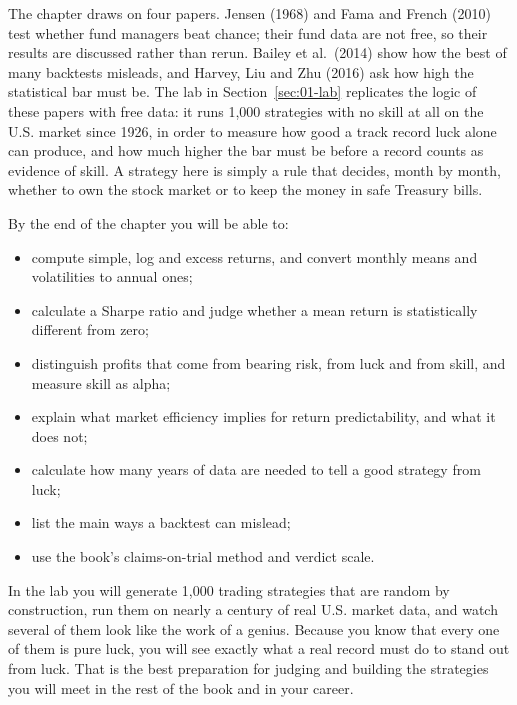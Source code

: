 The chapter draws on four papers. Jensen (1968) and Fama and French (2010) test whether fund managers beat chance; their fund data are not free, so their results are discussed rather than rerun. Bailey et al.\ (2014) show how the best of many backtests misleads, and Harvey, Liu and Zhu (2016) ask how high the statistical bar must be. The lab in Section~\ref{sec:01-lab} replicates the logic of these papers with free data: it runs 1,000 strategies with no skill at all on the U.S. market since 1926, in order to measure how good a track record luck alone can produce, and how much higher the bar must be before a record counts as evidence of skill. A strategy here is simply a rule that decides, month by month, whether to own the stock market or to keep the money in safe Treasury bills.

By the end of the chapter you will be able to:

\begin{itemize}
  \item compute simple, log and excess returns, and convert monthly means and volatilities to annual ones;
  \item calculate a Sharpe ratio and judge whether a mean return is statistically different from zero;
  \item distinguish profits that come from bearing risk, from luck and from skill, and measure skill as alpha;
  \item explain what market efficiency implies for return predictability, and what it does not;
  \item calculate how many years of data are needed to tell a good strategy from luck;
  \item list the main ways a backtest can mislead;
  \item use the book's claims-on-trial method and verdict scale.
\end{itemize}

In the lab you will generate 1,000 trading strategies that are random by construction, run them on nearly a century of real U.S. market data, and watch several of them look like the work of a genius. Because you know that every one of them is pure luck, you will see exactly what a real record must do to stand out from luck. That is the best preparation for judging and building the strategies you will meet in the rest of the book and in your career.

